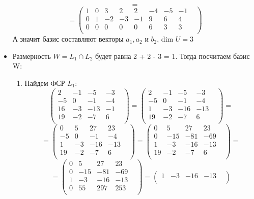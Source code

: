 \documentclass[a4paper,12pt]{article}
\begin{document}
\begin{itemize}
\[=
\]
\[
=
\begin{pmatrix}
1 & 0 & 3 & 2 & 2 & -4 & -5 & -1 & \\
0 & 1 & -2 & -3 & -1 & 9 & 6 & 4 & \\
0 & 0 & 0 & 0 & 0 & 6 & 3 & 3 & \\
\end{pmatrix}
\]
А значит базис составляют векторы $a_1, a_2$ и $b_2$, $\text{dim } U = 3$
\item Размерность $W = L_1 \cap L_2$ будет равна 2 + 2 - 3 = 1. Тогда посчитаем базис W:
\begin{enumerate}
\item
Найдем ФСР $L_1$:
\[
\begin{pmatrix}
2 & -1 & -5 & -3 & \\
-5 & 0 & -1 & -4 & \\
16 & -3 & -13 & -1 & \\
19 & -2 & -7 & 6 & \\
\end{pmatrix}
=
\begin{pmatrix}
2 & -1 & -5 & -3 & \\
-5 & 0 & -1 & -4 & \\
1 & -3 & -16 & -13 & \\
19 & -2 & -7 & 6 & \\
\end{pmatrix}
=
\]
\[
=
\begin{pmatrix}
0 & 5 & 27 & 23 & \\
-5 & 0 & -1 & -4 & \\
1 & -3 & -16 & -13 & \\
19 & -2 & -7 & 6 & \\
\end{pmatrix}
=
\begin{pmatrix}
0 & 5 & 27 & 23 & \\
0 & -15 & -81 & -69 & \\
1 & -3 & -16 & -13 & \\
19 & -2 & -7 & 6 & \\
\end{pmatrix}
=
\]
\[
=
\begin{pmatrix}
0 & 5 & 27 & 23 & \\
0 & -15 & -81 & -69 & \\
1 & -3 & -16 & -13 & \\
0 & 55 & 297 & 253 & \\
\end{pmatrix}
=
\begin{pmatrix}
1 & -3 & -16 & -13 & \\

\end{pmatrix}\]
\end{enumerate}
\end{itemize}
\end{document}
